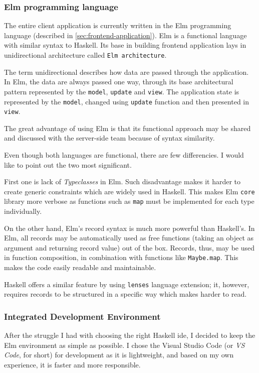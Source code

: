 \subsubsection*{Elm programming language}

The entire client application is currently written in the Elm programming language (described in \ref{sec:frontend-application}).
Elm is a functional language with similar syntax to Haskell.
Its base in building frontend application lays in unidirectional architecture called \texttt{Elm architecture}.

The term unidirectional describes how data are passed through the application.
In Elm, the data are always passed one way, through its base architectural pattern represented by the \texttt{model}, \texttt{update} and \texttt{view}.
The application state is represented by the \texttt{model}, changed using \texttt{update} function and then presented in \texttt{view}.

The great advantage of using Elm is that its functional approach may be shared and discussed with the server-side team because of syntax similarity.

Even though both languages are functional, there are few differencies\cite{mmh-elm-func-fe}.
I would like to point out the two most significant.

First one is lack of \textit{Typeclasses} in Elm.
Such disadvantage makes it harder to create generic constraints which are widely used in Haskell.
This makes Elm \texttt{core} library more verbose as functions such as \texttt{map} must be implemented for each type individually.

On the other hand, Elm's record syntax is much more powerful than Haskell's.
In Elm, all records may be automatically used as free functions (taking an object as argument and returning record value) out of the box.
Records, thus, may be used in function composition, in combination with functions like \texttt{Maybe.map}.
This makes the code easily readable and maintainable.

Haskell offers a similar feature by using \texttt{lenses} language extension; it, however, requires records to be structured in a specific way which makes harder to read.

\subsubsection*{Integrated Development Environment}

After the struggle I had with choosing the right Haskell \gls{ide}, I decided to keep the Elm environment as simple as possible.
I chose the Visual Studio Code (or \textit{VS Code}, for short) for development as it is lightweight, and based on my own experience, it is faster and more responsible.

